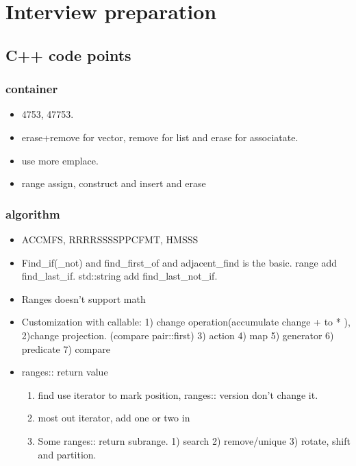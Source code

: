 \documentclass[a4paper,11pt,twoside]{book}
\begin{document}
	  
\chapter{Interview preparation}

\section{C++ code points}
\subsection{container}
\begin{itemize}
	\item 4753, 47753.
	
	\item erase+remove for vector, remove for list and erase for associatate. 
	
	\item use more emplace.
	
	\item range assign, construct and insert and erase
	
\end{itemize}
\subsection{algorithm}

\begin{itemize}
	\item ACCMFS, RRRRSSSSPPCFMT, HMSSS
	
	\item Find\_if(\_not) and find\_first\_of and adjacent\_find is the basic. range add find\_last\_if. std::string add find\_last\_not\_if. 
	
	\item Ranges doesn't support math
	
	\item Customization with callable: 1) change operation(accumulate change + to * ), 2)change projection. (compare pair::first)  3) action 4) map 5) generator 6) predicate 7) compare 
	
	\item ranges:: return value
	\begin{enumerate}
		\item find use iterator to mark position, ranges:: version don't change it. 
		
		\item most out iterator, add one or two in
		
		\item Some ranges:: return subrange. 1) search 2) remove/unique 3) rotate, shift and partition. 
	\end{enumerate}
	
\end{itemize}
\end{document}
